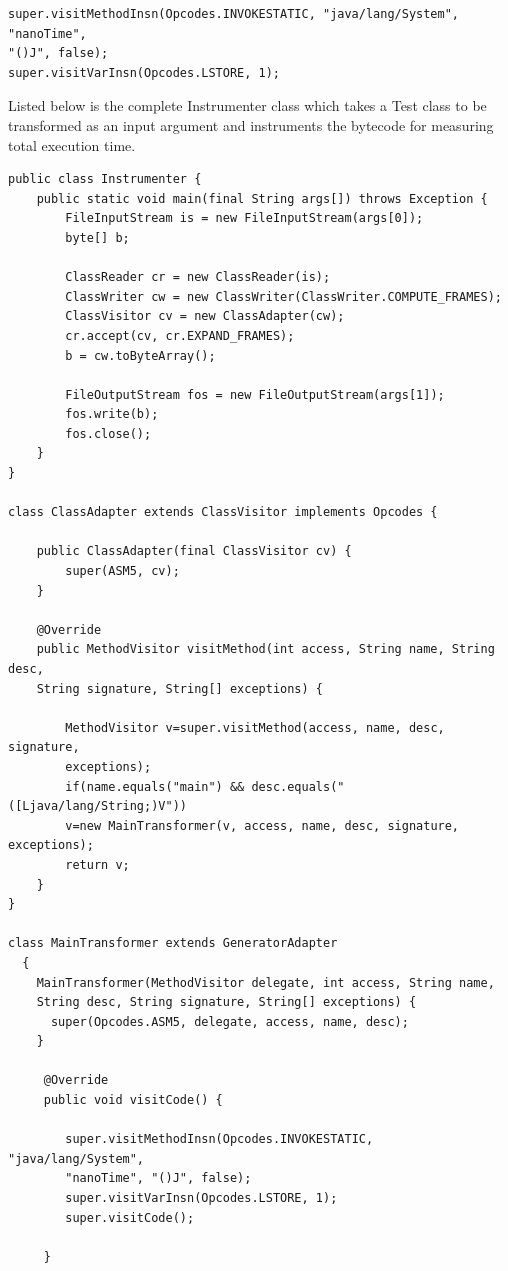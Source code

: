 \documentclass[11pt]{article}
\begin{document}
\begin{lstlisting}
super.visitMethodInsn(Opcodes.INVOKESTATIC, "java/lang/System", "nanoTime", 
"()J", false);
super.visitVarInsn(Opcodes.LSTORE, 1);
\end{lstlisting}

Listed below is the complete Instrumenter class which takes a Test class to be transformed as an input argument and instruments the bytecode for measuring total execution time.

\begin{lstlisting}
public class Instrumenter {
    public static void main(final String args[]) throws Exception {
        FileInputStream is = new FileInputStream(args[0]);
        byte[] b;

        ClassReader cr = new ClassReader(is);
        ClassWriter cw = new ClassWriter(ClassWriter.COMPUTE_FRAMES);
        ClassVisitor cv = new ClassAdapter(cw);
        cr.accept(cv, cr.EXPAND_FRAMES);
        b = cw.toByteArray();

        FileOutputStream fos = new FileOutputStream(args[1]);
        fos.write(b);
        fos.close();
    }
}

class ClassAdapter extends ClassVisitor implements Opcodes {

    public ClassAdapter(final ClassVisitor cv) {
        super(ASM5, cv);
    }

    @Override
    public MethodVisitor visitMethod(int access, String name, String desc, 
    String signature, String[] exceptions) {

        MethodVisitor v=super.visitMethod(access, name, desc, signature, 
        exceptions);
        if(name.equals("main") && desc.equals("([Ljava/lang/String;)V"))
        v=new MainTransformer(v, access, name, desc, signature, exceptions);
        return v;
    }
}

class MainTransformer extends GeneratorAdapter
  {
    MainTransformer(MethodVisitor delegate, int access, String name, 
    String desc, String signature, String[] exceptions) {
      super(Opcodes.ASM5, delegate, access, name, desc);
    }

     @Override
     public void visitCode() {

        super.visitMethodInsn(Opcodes.INVOKESTATIC, "java/lang/System", 
        "nanoTime", "()J", false);
        super.visitVarInsn(Opcodes.LSTORE, 1);
        super.visitCode();

     }


\end{lstlisting}
\end{document}
